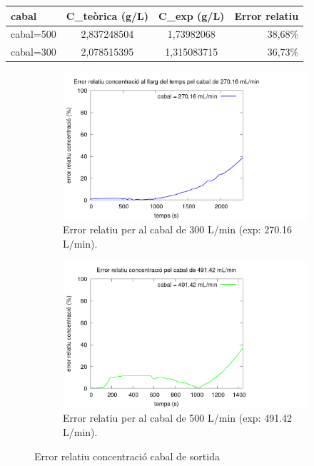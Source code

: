 \documentclass[10pt, twoside]{article}
\begin{document}
\begin{minipage}{\textwidth}
    \centering
    \label{tab:calibomba}
    \begin{tabular}{|l|c|c|r|}
        \hline
        cabal       &	C_{teòrica} (g/L)	&	C_{exp} (g/L)	    &   Error relatiu	\\ \hline
        cabal=500	&	2,837248504	&	1,73982068	&	38,68$\%$	\\ \hline
        cabal=300	&	2,078515395	&	1,315083715	&	36,73$\%$	\\ \hline
    \end{tabular}
\end{minipage}

\pagebreak
\begin{figure}[hbt!]
    \centering
    \begin{subfigure}{0.45\textwidth}
        \centering
        \includegraphics[width=\textwidth]{error300.png}
        \caption{Error relatiu per al cabal de 300 L/min (exp: 270.16 L/min).}
        \label{fig: error300}
    \end{subfigure}
    \hspace{0.025\textwidth}
    \begin{subfigure}{0.45\textwidth}
        \centering
        \includegraphics[width=\textwidth]{error500.png}
        \caption{Error relatiu per al cabal de 500 L/min (exp: 491.42 L/min).}
        \label{fig: error500}
    \end{subfigure}
    \caption{Error relatiu concentració cabal de sortida}
    \label{fig: errors}
\end{figure}
\end{document}
